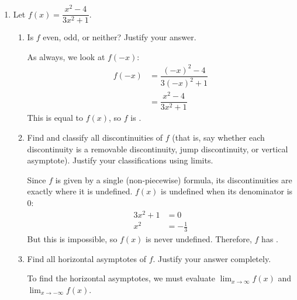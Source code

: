 \documentclass{article}
\theoremstyle{theorem}
\begin{document}
\begin{enumerate}
\begin{enumerate}
  \end{enumerate}

\item {}  

  Let $f(x) = \dfrac{x^2 - 4}{3x^2 + 1}$.

  \begin{enumerate}

  \item
    \begin{problem}[\vfill]
      Is $f$ even, odd, or neither? Justify your answer. 
    \end{problem}

    \begin{solution}
      As always, we look at $f(-x)$:
      \begin{align*}
        f(-x) &= \dfrac{(-x)^2 - 4}{3(-x)^2 + 1} \\
        &= \dfrac{x^2 - 4}{3x^2 + 1}
      \end{align*}
      This is equal to $f(x)$, so $f$ is . 
    \end{solution}

  \item
    \begin{problem}[\vfill]
      Find and classify all discontinuities of $f$ (that is, say whether each discontinuity is a removable discontinuity, jump discontinuity, or vertical asymptote). Justify your classifications using limits.
    \end{problem}

    \begin{solution}
      Since $f$ is given by a single (non-piecewise) formula, its discontinuities are exactly where it is undefined. $f(x)$ is undefined when its denominator is 0:
      \begin{align*}
        3x^2 + 1&= 0 \\
        x^2 &= - \frac{1}{3}
      \end{align*}
      But this is impossible, so $f(x)$ is never undefined. Therefore, $f$ has .
    \end{solution}

  \item
    \begin{problem}[\vfill\newpage]
      Find all horizontal asymptotes of $f$. Justify your answer completely. 
    \end{problem}

    \begin{solution}
      To find the horizontal asymptotes, we must evaluate $\displaystyle \lim_{x \to \infty} f(x)$ and $\displaystyle \lim_{x \to -\infty} f(x)$.


\end{solution}
\end{enumerate}
\end{enumerate}
\end{document}
